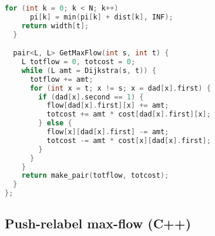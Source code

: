 \begin{lstlisting}[language=C++]
    for (int k = 0; k < N; k++)
      pi[k] = min(pi[k] + dist[k], INF);
    return width[t];
  }

  pair<L, L> GetMaxFlow(int s, int t) {
    L totflow = 0, totcost = 0;
    while (L amt = Dijkstra(s, t)) {
      totflow += amt;
      for (int x = t; x != s; x = dad[x].first) {
        if (dad[x].second == 1) {
          flow[dad[x].first][x] += amt;
          totcost += amt * cost[dad[x].first][x];
        } else {
          flow[x][dad[x].first] -= amt;
          totcost -= amt * cost[x][dad[x].first];
        }
      }
    }
    return make_pair(totflow, totcost);
  }
};

\end{lstlisting}
\subsection{Push-relabel max-flow (C++)}
